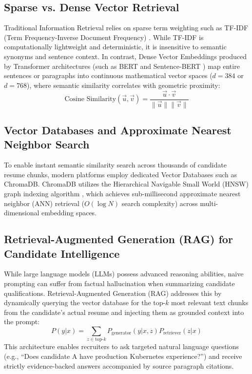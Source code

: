 \subsection{Sparse vs. Dense Vector Retrieval}
Traditional Information Retrieval relies on sparse term weighting such as TF-IDF (Term Frequency-Inverse Document Frequency) \cite{salton1988term}. While TF-IDF is computationally lightweight and deterministic, it is insensitive to semantic synonyms and sentence context. In contrast, Dense Vector Embeddings produced by Transformer architectures (such as BERT \cite{devlin2018bert} and Sentence-BERT \cite{reimers2019sentence}) map entire sentences or paragraphs into continuous mathematical vector spaces ($d=384$ or $d=768$), where semantic similarity correlates with geometric proximity:
\begin{equation}
    \text{Cosine Similarity}(\vec{u}, \vec{v}) = \frac{\vec{u} \cdot \vec{v}}{\|\vec{u}\| \|\vec{v}\|}
\end{equation}

\subsection{Vector Databases and Approximate Nearest Neighbor Search}
To enable instant semantic similarity search across thousands of candidate resume chunks, modern platforms employ dedicated Vector Databases such as ChromaDB. ChromaDB utilizes the Hierarchical Navigable Small World (HNSW) graph indexing algorithm \cite{malkov2018hnsw}, which achieves sub-millisecond approximate nearest neighbor (ANN) retrieval ($O(\log N)$ search complexity) across multi-dimensional embedding spaces.

\subsection{Retrieval-Augmented Generation (RAG) for Candidate Intelligence}
While large language models (LLMs) possess advanced reasoning abilities, naive prompting can suffer from factual hallucination when summarizing candidate qualifications. Retrieval-Augmented Generation (RAG) \cite{lewis2020rag} addresses this by dynamically querying the vector database for the top-$k$ most relevant text chunks from the candidate's actual resume and injecting them as grounded context into the prompt:
\begin{equation}
    P(y|x) = \sum_{z \in \text{top-}k} P_{\text{generator}}(y|x, z) P_{\text{retriever}}(z|x)
\end{equation}
This architecture enables recruiters to ask targeted natural language questions (e.g., ``Does candidate A have production Kubernetes experience?'') and receive strictly evidence-backed answers accompanied by source paragraph citations.

